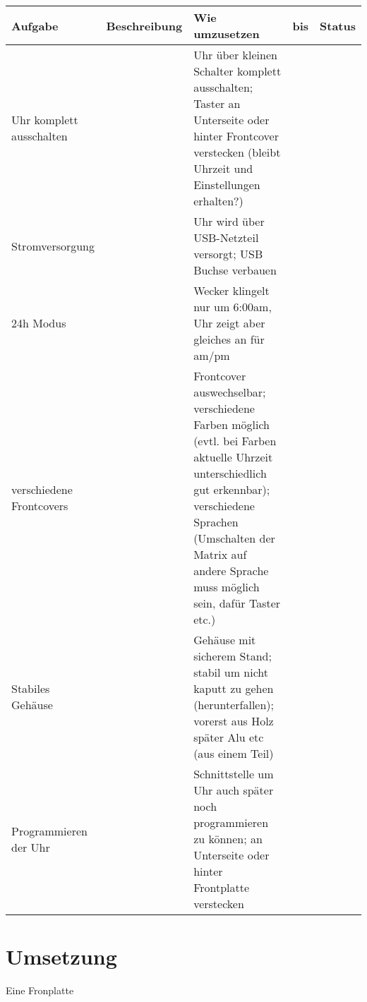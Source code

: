 \documentclass[11pt,a4paper,ngerman]{article}
\begin{document}
\begin{landscape}
	\newpage
	\begin{tabular}[]{p{2cm}p{2cm}p{10cm}p{2cm}p{2cm}}
	\toprule
	Aufgabe & Beschreibung & Wie umzusetzen  & bis & Status \\
	\midrule
	Uhr komplett ausschalten && Uhr über kleinen Schalter komplett ausschalten; Taster an Unterseite oder hinter Frontcover verstecken (bleibt Uhrzeit und Einstellungen erhalten?)\\
	Stromversorgung && Uhr wird über USB-Netzteil versorgt; USB Buchse verbauen \\
	24h Modus && Wecker klingelt nur um 6:00am, Uhr zeigt aber gleiches an für am/pm\\
	verschiedene Frontcovers & & Frontcover auswechselbar; verschiedene Farben möglich (evtl. bei Farben aktuelle Uhrzeit unterschiedlich gut erkennbar); verschiedene Sprachen (Umschalten der Matrix auf andere Sprache muss möglich sein, dafür Taster etc.)\\
	Stabiles Gehäuse & & Gehäuse mit sicherem Stand; stabil um nicht kaputt zu gehen (herunterfallen); vorerst aus Holz später Alu etc (aus einem Teil)\\
	Programmieren der Uhr && Schnittstelle um Uhr auch später noch programmieren zu können; an Unterseite oder hinter Frontplatte verstecken\\
\end{tabular}
\end{landscape}

\section{Umsetzung}
	Eine Fronplatte
\end{document}
